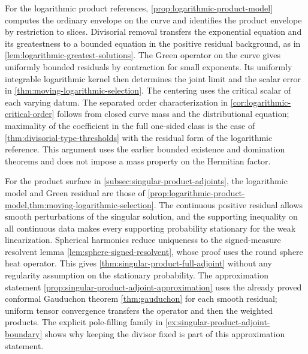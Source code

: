 \label{hist:logarithmic-model-selection}
For the logarithmic product references, \cref{prop:logarithmic-product-model} computes the ordinary envelope on the curve and identifies the product envelope by restriction to slices. Divisorial removal transfers the exponential equation and its greatestness to a bounded equation in the positive residual background, as in \cref{lem:logarithmic-greatest-solutions}. The Green operator on the curve gives uniformly bounded residuals by contraction for small exponents. Its uniformly integrable logarithmic kernel then determines the joint limit and the scalar error in \cref{thm:moving-logarithmic-selection}. The centering uses the critical scalar of each varying datum. The separated order characterization in \cref{cor:logarithmic-critical-order} follows from closed curve mass and the distributional equation; maximality of the coefficient in the full one-sided class is the case of \cref{thm:divisorial-type-thresholds} with the residual form of the logarithmic reference. This argument uses the earlier bounded existence and domination theorems and does not impose a mass property on the Hermitian factor.

\label{hist:singular-product-adjoints}
For the product surface in \cref{subsec:singular-product-adjoints}, the logarithmic model and Green residual are those of \cref{prop:logarithmic-product-model,thm:moving-logarithmic-selection}. The continuous positive residual allows smooth perturbations of the singular solution, and the supporting inequality on all continuous data makes every supporting probability stationary for the weak linearization. Spherical harmonics reduce uniqueness to the signed-measure resolvent lemma \cref{lem:sphere-signed-resolvent}, whose proof uses the round sphere heat operator. This gives \cref{thm:singular-product-full-adjoint} without any regularity assumption on the stationary probability. The approximation statement \cref{prop:singular-product-adjoint-approximation} uses the already proved conformal Gauduchon theorem \cref{thm:gauduchon} for each smooth residual; uniform tensor convergence transfers the operator and then the weighted products. The explicit pole-filling family in \cref{ex:singular-product-adjoint-boundary} shows why keeping the divisor fixed is part of this approximation statement.

